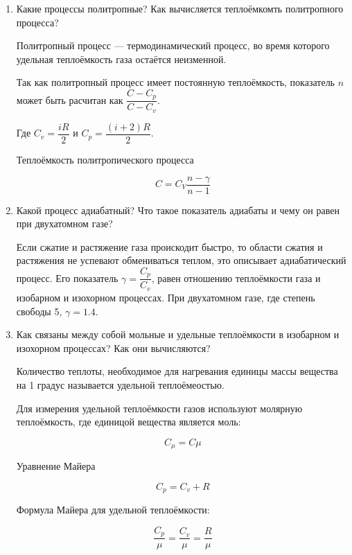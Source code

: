 \documentclass[12pt,a4paper]{article}%
\begin{document}
\begin{enumerate}
	
	\item Какие процессы политропные? Как вычисляется теплоёмкомть политропного процесса?
	
	Политропный процесс --- термодинамический процесс, во время которого удельная теплоёмкость газа остаётся неизменной. 
	
	Так как политропный процесс имеет постоянную теплоёмкость, показатель $ n $ может быть расчитан как $ \dfrac{C-C_p}{C-C_v} $.
	
	Где $ C_v = \dfrac{iR}{2} $ и $ C_p = \dfrac{(i+2)R}{2} $.
	
	Теплоёмкость политропического процесса
	
	\begin{equation}
		C = C_V\dfrac{n - \gamma}{n - 1}
	\end{equation}
	
	
	\item Какой процесс адиабатный? Что такое показатель адиабаты и чему он равен при двухатомном газе?
	
	Если сжатие и растяжение газа проискодит быстро, то области сжатия и растяжения не успевают обмениваться теплом, это описывает адиабатический процесс. Его показатель $ \gamma = \dfrac{C_p}{C_v} $, равен отношению теплоёмкости газа и изобарном и изохорном процессах. При двухатомном газе, где степень свободы 5, $ \gamma = 1.4 $.
	
	\item Как связаны между собой мольные и удельные теплоёмкости в изобарном и изохорном процессах? Как они вычисляются?
	
	Количество теплоты, необходимое для нагревания единицы массы вещества на 1 градус называется удельной теплоёмеостью.
	
	Для измерения удельной теплоёмкости газов используют молярную теплоёмкость, где единицой вещества является моль:
	
	\begin{equation}
	C_\mu = C\mu
	\end{equation}
	
	Уравнение Майера
	
	\begin{equation}
	C_p = C_v + R
	\end{equation}
	
	Формула Майера для удельной теплоёмкости:
	
	\begin{equation}
	\dfrac{C_p}{\mu} = \dfrac{C_v}{\mu} = \dfrac{R}{\mu}
	\end{equation}
	
	
\end{enumerate}

 
\end{document}
